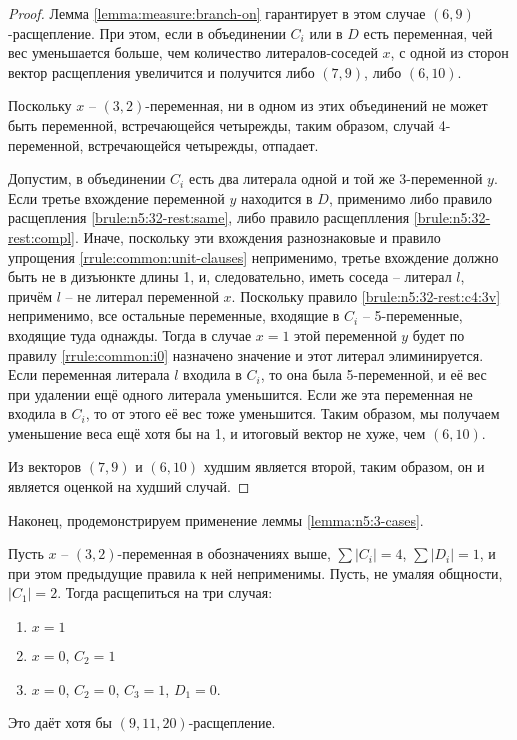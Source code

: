 \begin{proof}
 Лемма \ref{lemma:measure:branch-on} гарантирует в этом случае $(6,9)$-расщепление. При этом, если в объединении $C_i$ или в $D$ есть переменная, чей вес уменьшается больше, чем количество литералов-соседей $x$, с одной из сторон вектор расщепления увеличится и получится либо $(7,9)$, либо $(6,10)$.

 Поскольку $x$ -- $(3,2)$-переменная, ни в одном из этих объединений не может быть переменной, встречающейся четырежды, таким образом, случай 4-переменной, встречающейся четырежды, отпадает.

 Допустим, в объединении $C_i$ есть два литерала одной и той же 3-переменной $y$. Если третье вхождение переменной $y$ находится в $D$, применимо либо правило расщепления \ref{brule:n5:32-rest:same}, либо правило расщеплления \ref{brule:n5:32-rest:compl}. Иначе, поскольку эти вхождения разнознаковые и правило упрощения \ref{rrule:common:unit-clauses} неприменимо, третье вхождение должно быть не в дизъюнкте длины 1, и, следовательно, иметь соседа -- литерал $l$, причём $l$ -- не литерал переменной $x$. Поскольку правило \ref{brule:n5:32-rest:c4:3v} неприменимо, все остальные переменные, входящие в $C_i$ -- 5-переменные, входящие туда однажды. Тогда в случае $x = 1$ этой переменной $y$ будет по правилу \ref{rrule:common:i0} назначено значение и этот литерал элиминируется. Если переменная литерала $l$ входила в $C_i$, то она была 5-переменной, и её вес при удалении ещё одного литерала уменьшится. Если же эта переменная не входила в $C_i$, то от этого её вес тоже уменьшится. Таким образом, мы получаем уменьшение веса ещё хотя бы на 1, и итоговый вектор не хуже, чем $(6,10)$.

 Из векторов $(7,9)$ и $(6,10)$ худшим является второй, таким образом, он и является оценкой на худший случай.
\end{proof}

Наконец, продемонстрируем применение леммы \ref{lemma:n5:3-cases}.

\begin{brule}
 Пусть $x$ -- $(3,2)$-переменная в обозначениях выше, $\sum |C_i| = 4$, $\sum |D_i| = 1$, и при этом предыдущие правила к ней неприменимы. Пусть, не умаляя общности, $|C_1| = 2$. Тогда расщепиться на три случая:

 \begin{enumerate}
  \item $x = 1$
  \item $x = 0$, $C_2 = 1$
  \item $x = 0$, $C_2 = 0$, $C_3 = 1$, $D_1 = 0$.
 \end{enumerate}

 Это даёт хотя бы $(9,11,20)$-расщепление.
 \label{brule:n5:32-rest:c4:3-cases}
\end{brule}

